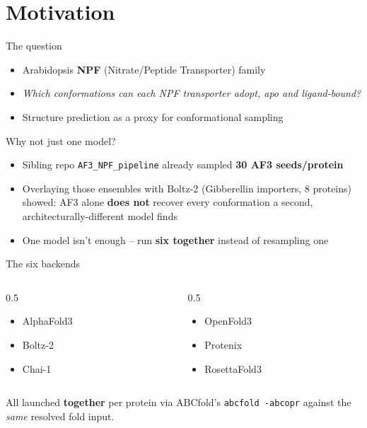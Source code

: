 \documentclass[aspectratio=169]{beamer}
\begin{document}
\section{Motivation}

\begin{frame}{The question}
  \begin{itemize}
    \item Arabidopsis \textbf{NPF} (Nitrate/Peptide Transporter) family
      \item[] %
        \textit{Which conformations can each NPF transporter adopt, apo and
        ligand-bound?}
    \item Structure prediction as a proxy for conformational sampling
  \end{itemize}
\end{frame}

\begin{frame}{Why not just one model?}
  \begin{itemize}
    \item Sibling repo \texttt{AF3\_NPF\_pipeline} already sampled
      \textbf{30 AF3 seeds/protein}
    \item Overlaying those ensembles with Boltz-2 (Gibberellin importers,
      8 proteins) showed: AF3 alone \textbf{does not} recover every
      conformation a second, architecturally-different model finds
    \item[$\Rightarrow$] One model isn't enough -- run \textbf{six together}
      instead of resampling one
  \end{itemize}
\end{frame}

\begin{frame}{The six backends}
  \begin{columns}[T]
    \begin{column}{0.5\textwidth}
      \begin{itemize}
        \item AlphaFold3
        \item Boltz-2
        \item Chai-1
      \end{itemize}
    \end{column}
    \begin{column}{0.5\textwidth}
      \begin{itemize}
        \item OpenFold3
        \item Protenix
        \item RosettaFold3
      \end{itemize}
    \end{column}
  \end{columns}
  \vspace{1em}
  \centering
  All launched \textbf{together} per protein via ABCfold's
  \texttt{abcfold -abcopr} against the \emph{same} resolved fold input.
\end{frame}
\end{document}
